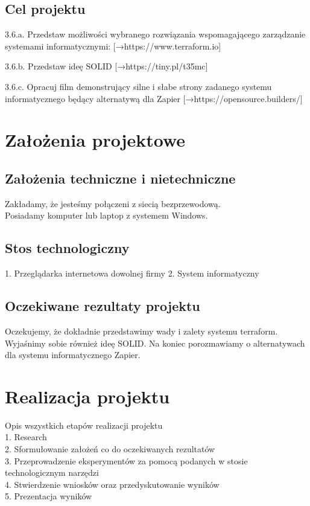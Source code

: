 \documentclass[12pt,a4paper]{article}
\begin{document}
\subsection{Cel projektu}
3.6.a. Przedstaw możliwości wybranego rozwiązania wspomagającego zarządzanie systemami informatycznymi: [→https://www.terraform.io]

3.6.b. Przedstaw ideę SOLID [→https://tiny.pl/t35mc]

3.6.c. Opracuj film demonstrujący silne i słabe strony zadanego systemu informatycznego będący alternatywą dla Zapier [→https://opensource.builders/]

\newpage

\section{Założenia projektowe}
\subsection{Założenia techniczne i nietechniczne}

Zakładamy, że jesteśmy połączeni z siecią bezprzewodową. \\
Posiadamy komputer lub laptop z systemem Windows.

\subsection{Stos technologiczny}
1. Przeglądarka internetowa dowolnej firmy
2. System informatyczny

\subsection{Oczekiwane rezultaty projektu}
Oczekujemy, że dokładnie przedstawimy wady i zalety systemu terraform. \newline
Wyjaśnimy sobie również ideę SOLID. Na koniec porozmawiamy o alternatywach dla systemu informatycznego Zapier.

\newpage
\section{Realizacja projektu}
Opis wszystkich etapów realizacji projektu \\
1. Research \\
2. Sformułowanie założeń co do oczekiwanych rezultatów \\
3. Przeprowadzenie eksperymentów za pomocą podanych w stosie technologicznym narzędzi \\
4. Stwierdzenie wniosków oraz przedyskutowanie wyników \\
5. Prezentacja wyników \\
\newpage
\end{document}
